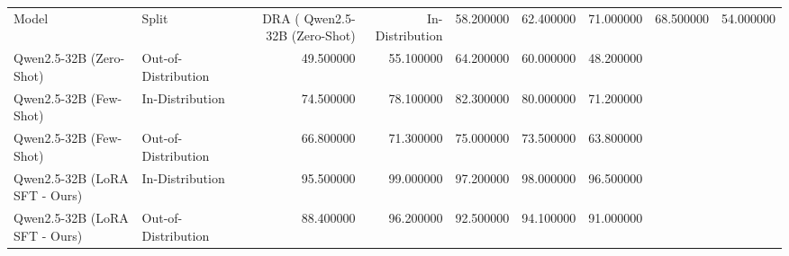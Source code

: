 \begin{tabular}{llrrrrr}
\toprule
Model & Split & DRA (%
\midrule
Qwen2.5-32B (Zero-Shot) & In-Distribution & 58.200000 & 62.400000 & 71.000000 & 68.500000 & 54.000000 \\
Qwen2.5-32B (Zero-Shot) & Out-of-Distribution & 49.500000 & 55.100000 & 64.200000 & 60.000000 & 48.200000 \\
Qwen2.5-32B (Few-Shot) & In-Distribution & 74.500000 & 78.100000 & 82.300000 & 80.000000 & 71.200000 \\
Qwen2.5-32B (Few-Shot) & Out-of-Distribution & 66.800000 & 71.300000 & 75.000000 & 73.500000 & 63.800000 \\
Qwen2.5-32B (LoRA SFT - Ours) & In-Distribution & 95.500000 & 99.000000 & 97.200000 & 98.000000 & 96.500000 \\
Qwen2.5-32B (LoRA SFT - Ours) & Out-of-Distribution & 88.400000 & 96.200000 & 92.500000 & 94.100000 & 91.000000 \\
\bottomrule
\end{tabular}
